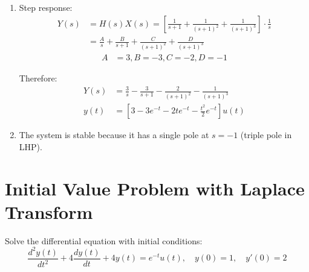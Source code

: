 \documentclass{article}
\begin{document}
\begin{enumerate}[label=(\alph*)]
    \item Step response:
    \begin{align*}
        Y(s) &= H(s)X(s) = \left[\frac{1}{s + 1} + \frac{1}{(s + 1)^2} + \frac{1}{(s + 1)^3}\right] \cdot \frac{1}{s} \\
        &= \frac{A}{s} + \frac{B}{s + 1} + \frac{C}{(s + 1)^2} + \frac{D}{(s + 1)^3}
    \end{align*}
    \begin{align*}
        A &= 3, B = -3, C = -2, D = -1
    \end{align*}
    
    
    Therefore:
    \begin{align*}
        Y(s) &= \frac{3}{s} - \frac{3}{s + 1} - \frac{2}{(s + 1)^2} - \frac{1}{(s + 1)^3} \\
        y(t) &= [3 - 3e^{-t} - 2te^{-t} - \frac{t^2}{2}e^{-t}]u(t)
    \end{align*}
    
    \item The system is stable because it has a single pole at $s = -1$ (triple pole in LHP).
\end{enumerate}

\section{Initial Value Problem with Laplace Transform}
Solve the differential equation with initial conditions:
\[ \frac{d^2y(t)}{dt^2} + 4\frac{dy(t)}{dt} + 4y(t) = e^{-t}u(t), \quad y(0) = 1, \quad y'(0) = 2 \]
\end{document}
